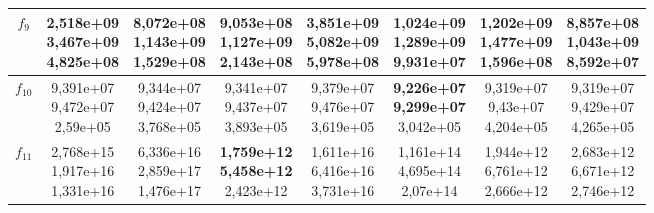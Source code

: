 \begin{table}[t]
\begin{small}
\begin{tabular}{|c|c|c|c|c|c|c|c|}
        $f_9$    & \makecell{2,518e+09 \\ 3,467e+09 \\ 4,825e+08} & \makecell{\textbf{8,072e+08} \\ 1,143e+09 \\ 1,529e+08} & \makecell{9,053e+08 \\ 1,127e+09 \\ 2,143e+08} & \makecell{3,851e+09 \\ 5,082e+09 \\ 5,978e+08} & \makecell{1,024e+09 \\ 1,289e+09 \\ 9,931e+07} & \makecell{1,202e+09 \\ 1,477e+09 \\ 1,596e+08} & \makecell{8,857e+08 \\ \textbf{1,043e+09} \\ 8,592e+07} \\\hline
        $f_{10}$ & \makecell{9,391e+07 \\ 9,472e+07 \\ 2,59e+05}  & \makecell{9,344e+07 \\ 9,424e+07 \\ 3,768e+05} & \makecell{9,341e+07 \\ 9,437e+07 \\ 3,893e+05} & \makecell{9,379e+07 \\ 9,476e+07 \\ 3,619e+05} & \makecell{\textbf{9,226e+07} \\ \textbf{9,299e+07} \\ 3,042e+05} & \makecell{9,319e+07 \\ 9,43e+07 \\ 4,204e+05} & \makecell{9,319e+07 \\ 9,429e+07 \\ 4,265e+05} \\\hline
        $f_{11}$ & \makecell{2,768e+15 \\ 1,917e+16 \\ 1,331e+16} & \makecell{6,336e+16 \\ 2,859e+17 \\ 1,476e+17} & \makecell{\textbf{1,759e+12} \\ \textbf{5,458e+12} \\ 2,423e+12} & \makecell{1,611e+16 \\ 6,416e+16 \\ 3,731e+16} & \makecell{1,161e+14 \\ 4,695e+14 \\ 2,07e+14}  & \makecell{1,944e+12 \\ 6,761e+12 \\ 2,666e+12} & \makecell{2,683e+12 \\ 6,671e+12 \\ 2,746e+12} \\\hline

\end{tabular}
\end{small}
\end{table}
